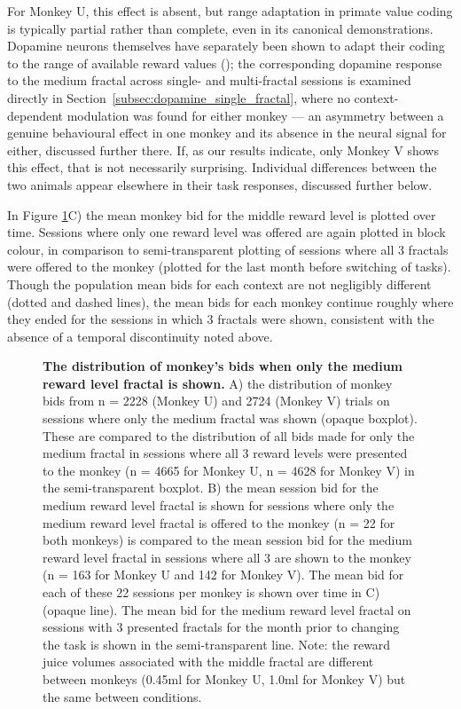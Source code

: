 For Monkey U, this effect is absent, but range adaptation in primate value coding is typically partial rather than complete, even in its canonical demonstrations.
Dopamine neurons themselves have separately been shown to adapt their coding to the range of available reward values (\cite{toblerAdaptiveCodingReward2005});
the corresponding dopamine response to the medium fractal across single- and multi-fractal sessions is examined directly in Section~\ref{subsec:dopamine_single_fractal},
where no context-dependent modulation was found for either monkey --- an asymmetry between a genuine behavioural effect in one monkey and its absence in the neural signal for either, discussed further there.
If, as our results indicate, only Monkey V shows this effect, that is not necessarily surprising.
Individual differences between the two animals appear elsewhere in their task responses, discussed further below.

In Figure \ref{fig:single_fractal_bids}C) the mean monkey bid for the middle reward level is plotted over time. Sessions where only one reward level was offered are again plotted in block colour, in comparison to semi-transparent plotting of sessions where all 3 fractals were offered to the monkey (plotted for the last month before switching of tasks). Though the population mean bids for each context are not negligibly different (dotted and dashed lines), the mean bids for each monkey continue roughly where they ended for the sessions in which 3 fractals were shown, consistent with the absence of a temporal discontinuity noted above.

\begin{figure}[htbp!] 
\centering    

\caption[The distribution of monkey’s bids when only the medium reward level fractal is shown.]{\textbf{The distribution of monkey’s bids when only the medium reward level fractal is shown.} A) the distribution of monkey bids from n = 2228 (Monkey U) and 2724 (Monkey V) trials on sessions where only the medium fractal was shown (opaque boxplot). These are compared to the distribution of all bids made for only the medium fractal in sessions where all 3 reward levels were presented to the monkey (n = 4665 for Monkey U, n = 4628 for Monkey V) in the semi-transparent boxplot. B) the mean session bid for the medium reward level fractal is shown for sessions where only the medium reward level fractal is offered to the monkey (n = 22 for both monkeys) is compared to the mean session bid for the medium reward level fractal in sessions where all 3 are shown to the monkey (n = 163 for Monkey U and 142 for Monkey V). The mean bid for each of these 22 sessions per monkey is shown over time in C) (opaque line). The mean bid for the medium reward level fractal on sessions with 3 presented fractals for the month prior to changing the task is shown in the semi-transparent line. Note: the reward juice volumes associated with the middle fractal are different between monkeys (0.45ml for Monkey U, 1.0ml for Monkey V) but the same between conditions.}
\label{fig:single_fractal_bids}
\end{figure}


